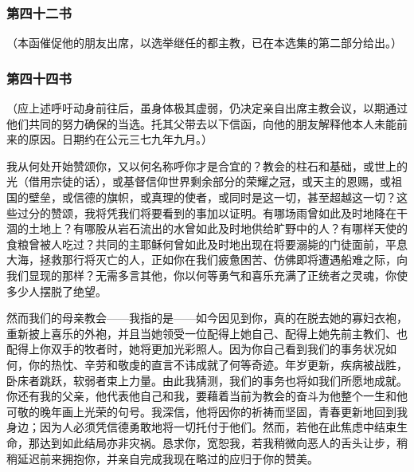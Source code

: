 \subsubsection{第四十二书}

（本函催促他的朋友出席，以选举继任的都主教，已在本选集的第二部分给出。）\par


\subsubsection{第四十四书}

（应上述呼吁动身前往后，虽身体极其虚弱，仍决定亲自出席主教会议，以期通过他们共同的努力确保的当选。托其父带去以下信函，向他的朋友解释他本人未能前来的原因。日期约在公元三七九年九月。）\par

我从何处开始赞颂你，又以何名称呼你才是合宜的？教会的柱石和基础，或世上的光（借用宗徒的话），或基督信仰世界剩余部分的荣耀之冠，或天主的恩赐，或祖国的壁垒，或信德的旗帜，或真理的使者，或同时是这一切，甚至超越这一切？这些过分的赞颂，我将凭我们将要看到的事加以证明。有哪场雨曾如此及时地降在干涸的土地上？有哪股从岩石流出的水曾如此及时地供给旷野中的人？有哪样天使的食粮曾被人吃过？共同的主耶稣何曾如此及时地出现在将要溺毙的门徒面前，平息大海，拯救那行将灭亡的人，正如你在我们疲惫困苦、仿佛即将遭遇船难之际，向我们显现的那样？无需多言其他，你以何等勇气和喜乐充满了正统者之灵魂，你使多少人摆脱了绝望。\par

然而我们的母亲教会——我指的是——如今因见到你，真的在脱去她的寡妇衣袍，重新披上喜乐的外袍，并且当她领受一位配得上她自己、配得上她先前主教们、也配得上你双手的牧者时，她将更加光彩照人。因为你自己看到我们的事务状况如何，你的热忱、辛劳和敬虔的直言不讳成就了何等奇迹。年岁更新，疾病被战胜，卧床者跳跃，软弱者束上力量。由此我猜测，我们的事务也将如我们所愿地成就。你还有我的父亲，他代表他自己和我，要藉着当前为教会的奋斗为他整个一生和他可敬的晚年画上光荣的句号。我深信，他将因你的祈祷而坚固，青春更新地回到我身边；因为人必须凭信德勇敢地将一切托付于他们。然而，若他在此焦虑中结束生命，那达到如此结局亦非灾祸。恳求你，宽恕我，若我稍微向恶人的舌头让步，稍稍延迟前来拥抱你，并亲自完成我现在略过的应归于你的赞美。\par

